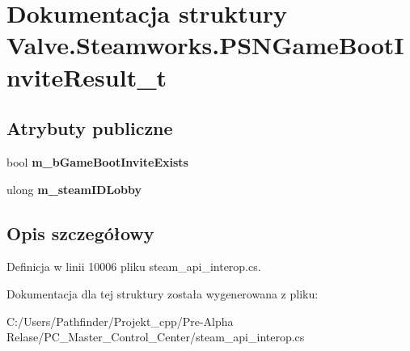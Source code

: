 \hypertarget{struct_valve_1_1_steamworks_1_1_p_s_n_game_boot_invite_result__t}{}\section{Dokumentacja struktury Valve.\+Steamworks.\+P\+S\+N\+Game\+Boot\+Invite\+Result\+\_\+t}
\label{struct_valve_1_1_steamworks_1_1_p_s_n_game_boot_invite_result__t}
\subsection*{Atrybuty publiczne}
\begin{DoxyCompactItemize}
\item 
\mbox{\label{struct_valve_1_1_steamworks_1_1_p_s_n_game_boot_invite_result__t_af492b14f21fe1248da943d6c32e99f0d}} 
bool {\bfseries m\+\_\+b\+Game\+Boot\+Invite\+Exists}
\item 
\mbox{\label{struct_valve_1_1_steamworks_1_1_p_s_n_game_boot_invite_result__t_a4fcba786c75bb16dc76ec1136f309c41}} 
ulong {\bfseries m\+\_\+steam\+I\+D\+Lobby}
\end{DoxyCompactItemize}


\subsection{Opis szczegółowy}


Definicja w linii 10006 pliku steam\+\_\+api\+\_\+interop.\+cs.



Dokumentacja dla tej struktury została wygenerowana z pliku\+:\begin{DoxyCompactItemize}
\item 
C\+:/\+Users/\+Pathfinder/\+Projekt\+\_\+cpp/\+Pre-\/\+Alpha Relase/\+P\+C\+\_\+\+Master\+\_\+\+Control\+\_\+\+Center/steam\+\_\+api\+\_\+interop.\+cs\end{DoxyCompactItemize}
